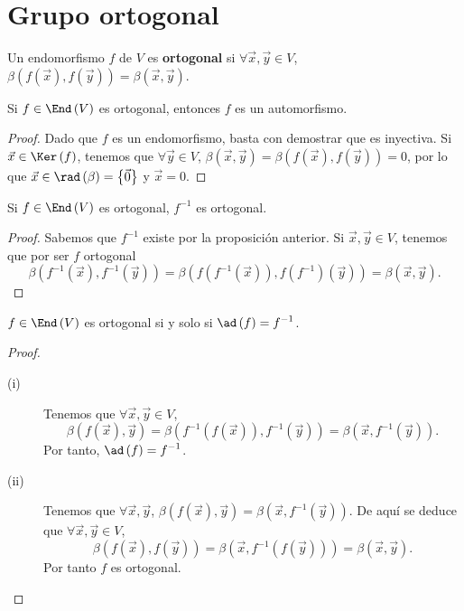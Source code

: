 \section{Grupo ortogonal}
\begin{fdefinition}[]
\normalfont Un endomorfismo $\displaystyle f $  de $\displaystyle V $ es \textbf{ortogonal} si $\displaystyle \forall \vec{x}, \vec{y} \in V $, $\displaystyle \beta\left(f\left(\vec{x}\right), f\left(\vec{y}\right)\right) = \beta\left(\vec{x}, \vec{y}\right) $.
\end{fdefinition}
\begin{fprop}[]
\normalfont Si $\displaystyle f \in \End\left(V\right) $ es ortogonal, entonces $\displaystyle f $ es un automorfismo.
\end{fprop}
\begin{proof}
	Dado que $\displaystyle f $ es un endomorfismo, basta con demostrar que es inyectiva. Si $\displaystyle \vec{x} \in \Ker\left(f\right) $, tenemos que $\displaystyle \forall \vec{y} \in V $, $\displaystyle \beta\left(\vec{x}, \vec{y}\right) =\beta\left(f\left(\vec{x}\right), f\left(\vec{y}\right)\right) = 0 $, por lo que $\displaystyle \vec{x} \in \rad\left(\beta \right) = \left\{ \vec{0}\right\}  $ y $\displaystyle \vec{x} = 0 $. 
\end{proof}
\begin{fprop}[]
\normalfont Si $\displaystyle f \in \End\left(V\right)$ es ortogonal, $\displaystyle f^{-1} $ es ortogonal.
\end{fprop}
\begin{proof}
Sabemos que $\displaystyle f^{-1} $ existe por la proposición anterior. Si $\displaystyle \vec{x}, \vec{y} \in V $, tenemos que por ser $\displaystyle f $ ortogonal 
\[ \beta\left(f^{-1}\left(\vec{x}\right), f^{-1}\left(\vec{y}\right)\right) = \beta\left(f\left(f^{-1}\left(\vec{x}\right)\right), f\left(f^{-1}\right)\left(\vec{y}\right)\right) = \beta\left(\vec{x}, \vec{y}\right).\]
\end{proof}
\begin{fprop}[]
\normalfont $\displaystyle f \in \End\left(V\right) $ es ortogonal si y solo si $\displaystyle \ad\left(f\right) = f^{-1} $.
\end{fprop}
\begin{proof}
\begin{description}
\item[(i)] Tenemos que $\displaystyle \forall \vec{x}, \vec{y} \in V $,
	\[ \beta\left(f\left(\vec{x}\right), \vec{y}\right) = \beta\left(f^{-1}\left(f\left(\vec{x}\right)\right), f^{-1}\left(\vec{y}\right)\right)=\beta\left(\vec{x}, f^{-1}\left(\vec{y}\right)\right).\]
Por tanto, $\displaystyle \ad\left(f\right) = f^{-1} $.
\item[(ii)] Tenemos que $\displaystyle \forall \vec{x}, \vec{y} $, $\displaystyle \beta\left(f\left(\vec{x}\right), \vec{y}\right) = \beta\left(\vec{x}, f^{-1}\left(\vec{y}\right)\right) $. De aquí se deduce que $\displaystyle \forall \vec{x}, \vec{y} \in V $,
	\[\beta\left(f\left(\vec{x}\right), f\left(\vec{y}\right)\right) = \beta\left(\vec{x}, f^{-1}\left(f\left(\vec{y}\right)\right)\right) = \beta\left(\vec{x}, \vec{y}\right).\]
	Por tanto $\displaystyle f $ es ortogonal.
\end{description}
\end{proof}
